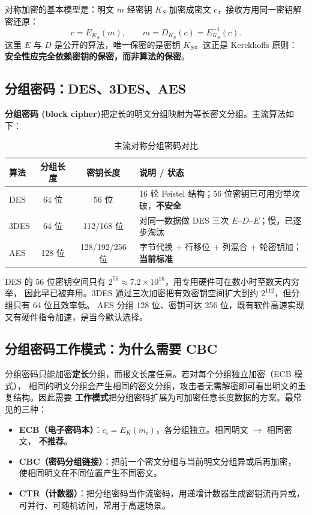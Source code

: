 对称加密的基本模型是：明文 $m$ 经密钥 $K_S$ 加密成密文 $c$，接收方用同一密钥解密还原：
\begin{equation}
    c = E_{K_S}(m), \qquad m = D_{K_S}(c) = E_{K_S}^{-1}(c).
    \label{eq:sym}
\end{equation}
这里 $E$ 与 $D$ 是公开的算法，唯一保密的是密钥 $K_S$。这正是 Kerckhoffs 原则：
\textbf{安全性应完全依赖密钥的保密，而非算法的保密}。

\subsection{分组密码：DES、3DES、AES}

\textbf{分组密码 (block cipher)}把定长的明文分组映射为等长密文分组。主流算法如下：

\begin{table}[H]
\centering
\renewcommand{\arraystretch}{1.4}
\begin{tabulary}{\textwidth}{@{}L C C L@{}}
\toprule
\textbf{算法} & \textbf{分组长度} & \textbf{密钥长度} & \textbf{说明 / 状态} \\
\midrule
DES & 64 位 & 56 位 & 16 轮 Feistel 结构；56 位密钥已可用穷举攻破，\textbf{不安全} \\
3DES & 64 位 & 112/168 位 & 对同一数据做 DES 三次 $E$--$D$--$E$；慢，已逐步淘汰 \\
AES & 128 位 & 128/192/256 位 & 字节代换 + 行移位 + 列混合 + 轮密钥加；\textbf{当前标准} \\
\bottomrule
\end{tabulary}
\caption{主流对称分组密码对比}
\label{tab:blockcipher}
\end{table}

DES 的 56 位密钥空间只有 $2^{56}\approx 7.2\times10^{16}$，用专用硬件可在数小时至数天内穷举，
因此早已被弃用。3DES 通过三次加密把有效密钥空间扩大到约 $2^{112}$，但分组只有 64 位且效率低。
AES 分组 128 位、密钥可达 256 位，既有软件高速实现又有硬件指令加速，是当今默认选择。

\subsection{分组密码工作模式：为什么需要 CBC}

分组密码只能加密\textbf{定长}分组，而报文长度任意。若对每个分组独立加密（ECB 模式），
相同的明文分组会产生相同的密文分组，攻击者无需解密即可看出明文的重复结构。因此需要
\textbf{工作模式}把分组密码扩展为可加密任意长度数据的方案。最常见的三种：

\begin{itemize}
    \item \textbf{ECB（电子密码本）}：$c_i = E_K(m_i)$，各分组独立。相同明文 $\to$ 相同密文，
    \textbf{不推荐}。
    \item \textbf{CBC（密码分组链接）}：把前一个密文分组与当前明文分组异或后再加密，
    使相同明文在不同位置产生不同密文。
    \item \textbf{CTR（计数器）}：把分组密码当作流密码，用递增计数器生成密钥流再异或，
    可并行、可随机访问，常用于高速场景。
\end{itemize}

